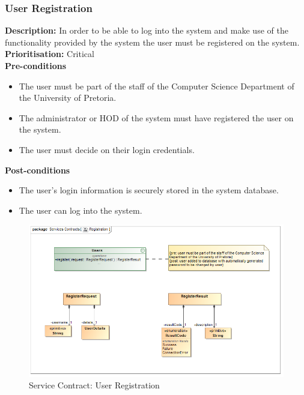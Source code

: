 \documentclass[a4paper]{article}
\begin{document}
        \pagebreak
    \subsubsection{User Registration}
        
        \textbf{Description:}  In order to be able to log into the system and make use of the functionality provided by the system the user must be registered on the system. \\
        \textbf{Prioritisation:} Critical\\
       
        \textbf{Pre-conditions}
         \begin{itemize}
            \item The user must be part of the staff of the Computer Science Department of the University of Pretoria.
            \item The administrator or HOD of the system must have registered the user on the system.
            \item The user must decide on their login credentials.
       \end{itemize}
        
        \textbf{Post-conditions}
        \begin{itemize}
            \item The user's login information is securely stored in the system database.
            \item The user can log into the system.
        \end{itemize}
        
        	\begin{figure}[H]
        		\centering
        		\includegraphics[width=\textwidth]{../Assignment1/5.1.2.Registration.Services.Contract.png}
        		\caption{Service Contract: User Registration}
        	\end{figure}
        
\end{document}
